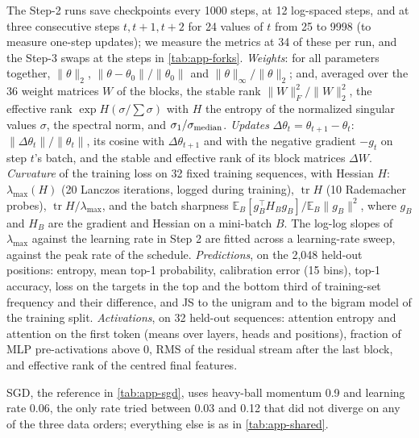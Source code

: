 The Step-2 runs save checkpoints every 1000 steps, at 12 log-spaced steps, and at three consecutive steps $t,t+1,t+2$
for 24 values of $t$ from 25 to 9998 (to measure one-step updates); we measure the metrics at 34 of these per run, and
the Step-3 swaps at the steps in \cref{tab:app-forks}. \emph{Weights}: for all parameters together, $\|\theta\|_2$,
$\|\theta-\theta_0\|/\|\theta_0\|$ and $\|\theta\|_\infty/\|\theta\|_2$; and, averaged over the 36 weight matrices
$W$ of the blocks, the stable rank $\|W\|_F^2/\|W\|_2^2$, the effective rank $\exp H(\sigma/\textstyle\sum\sigma)$
with $H$ the entropy of the normalized singular values $\sigma$, the spectral norm, and $\sigma_1/\sigma_{\rm median}$.
\emph{Updates} $\Delta\theta_t=\theta_{t+1}-\theta_t$: $\|\Delta\theta_t\|/\|\theta_t\|$, its cosine with
$\Delta\theta_{t+1}$ and with the negative gradient $-g_t$ on step $t$'s batch, and the stable and effective rank of
its block matrices $\Delta W$. \emph{Curvature} of the training loss on 32 fixed training sequences, with Hessian $H$:
$\lambda_{\max}(H)$ (20 Lanczos iterations, logged during training), $\operatorname{tr}H$ (10 Rademacher probes),
$\operatorname{tr}H/\lambda_{\max}$, and the batch sharpness $\mathbb{E}_B[g_B^\top H_Bg_B]/\mathbb{E}_B\|g_B\|^2$,
where $g_B$ and $H_B$ are the gradient and Hessian on a mini-batch $B$. The log-log slopes of $\lambda_{\max}$
against the learning rate in Step 2 are fitted across a learning-rate sweep, against the peak rate of the schedule.
\emph{Predictions}, on the 2{,}048 held-out
positions: entropy, mean top-1 probability, calibration error (15 bins), top-1 accuracy, loss on the targets in the top
and the bottom third of training-set frequency and their difference, and JS to the unigram and to the bigram model
of the training split. \emph{Activations}, on 32 held-out sequences: attention entropy
and attention on the first token (means over layers, heads and positions), fraction of MLP pre-activations above 0,
RMS of the residual stream after the last block, and effective rank of the centred final features.

SGD, the reference in \cref{tab:app-sgd}, uses heavy-ball momentum 0.9 and learning rate 0.06, the only rate tried
between 0.03 and 0.12 that did not diverge on any of the three data orders; everything else is as in
\cref{tab:app-shared}.


